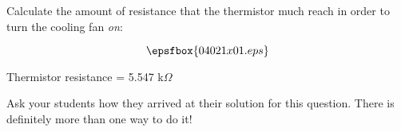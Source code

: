 

Calculate the amount of resistance that the thermistor much reach in order to turn the cooling fan {\it on}:

$$\epsfbox{04021x01.eps}$$







Thermistor resistance = 5.547 k$\Omega$







Ask your students how they arrived at their solution for this question.  There is definitely more than one way to do it!




